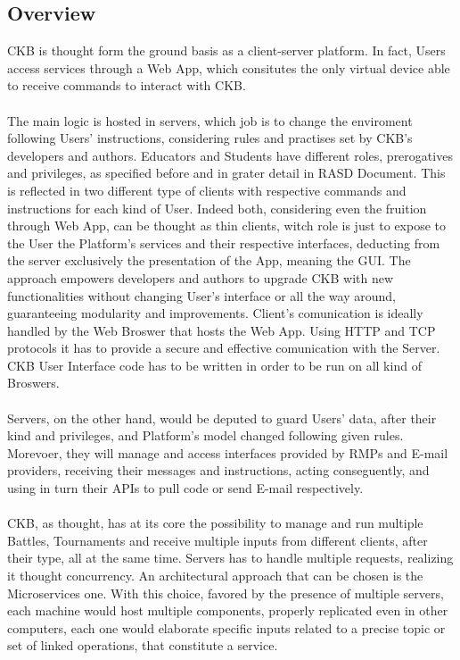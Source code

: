 \subsection{Overview}
CKB is thought form the ground basis as a client-server platform. In fact, Users access services through a Web App, which consitutes the only virtual device able to receive commands to interact with CKB.\\\\
The main logic is hosted in servers, which job is to change the enviroment following Users' instructions, considering rules and practises set by CKB's developers and authors.
Educators and Students have different roles, prerogatives and privileges, as specified before and in grater detail in RASD Document. This is reflected in two different type of clients with respective commands and instructions for each kind of User.
Indeed both, considering even the fruition through Web App, can be thought as thin clients, witch role is just to expose to the User the Platform's services and their respective interfaces, deducting from the server exclusively the presentation of the App, meaning the GUI.
The approach empowers developers and authors to upgrade CKB with new functionalities without changing User's interface or all the way around, guaranteeing modularity and improvements.
Client's comunication is ideally handled by the Web Broswer that hosts the Web App. Using HTTP and TCP protocols it has to provide a secure and effective comunication with the Server. CKB User Interface code has to be written in order to be run on all kind of Broswers.\\\\
Servers, on the other hand, would be deputed to guard Users' data, after their kind and privileges, and Platform's model changed following given rules. Morevoer, they will manage and access interfaces provided by RMPs and E-mail providers, receiving their messages and instructions, acting conseguently, and using in turn their APIs to pull code or send E-mail respectively.\\\\
CKB, as thought, has at its core the possibility to manage and run multiple Battles, Tournaments and receive multiple inputs from different clients, after their type, all at the same time. Servers has to handle multiple requests, realizing it thought concurrency. An architectural approach that can be chosen is the Microservices one. 
With this choice, favored by the presence of multiple servers, each machine would host multiple components, properly replicated even in other computers, each one would elaborate specific inputs related to a precise topic or set of linked operations, that constitute a service.
